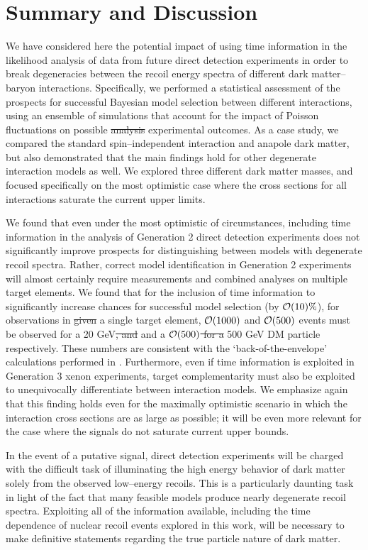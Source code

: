 \documentclass[11pt]{article}
\newcommand{\sjwColor}{red}
\newcommand{\sjw}[1]{{\color{\sjwColor} #1}}
\newcommand{\sjwrm}[1]{{\color{\sjwColor}\protect\sout{#1}}}
\begin{document}
\section{Summary and Discussion}\label{sec:conclusion}
We have considered here the potential impact of using time information in the likelihood analysis of data from future direct detection experiments in order to break degeneracies between the recoil energy spectra of different dark matter--baryon interactions. Specifically, we performed a statistical assessment of the prospects for successful Bayesian model selection between different interactions, using an ensemble of simulations that account for the impact of Poisson fluctuations on possible \sjwrm{analysis} \sjw{experimental} outcomes. As a case study, we compared the standard spin--independent interaction and anapole dark matter, but also demonstrated that the main findings hold for other degenerate interaction models as well. We explored three different dark matter masses, and focused specifically on the most optimistic case where the cross sections for all interactions saturate the current upper limits. 

We found that even under the most optimistic of circumstances, including time information in the analysis of Generation 2 direct detection experiments does not significantly improve prospects for distinguishing between models with degenerate recoil spectra. Rather, correct model identification in Generation 2 experiments will almost certainly require measurements and combined analyses on multiple target elements. We found that for the inclusion of time information to significantly increase chances for successful model selection (by ${\cal O}(10)\%$), \sjw{for observations in }\sjwrm{given} a single target element, ${\cal O}(1000)$ \sjw{and ${\cal O}(500)$} events must be observed for a 20 GeV\sjwrm{, and}\sjw{and a} \sjwrm{${\cal O}(500)$ for a} 500 GeV DM particle \sjw{respectively}. These numbers are consistent with the `back-of-the-envelope' calculations performed in \cite{DelNobile:2015nua}. Furthermore, even if time information is exploited in Generation 3 xenon experiments, target complementarity must also be exploited to unequivocally differentiate between interaction models. We emphasize again that this finding holds even for the maximally optimistic scenario in which the interaction cross sections are as large as possible; it will be even more relevant for the case where the signals do not saturate current upper bounds.

In the event of a putative signal, direct detection experiments will be charged with the difficult task of illuminating the high energy behavior of dark matter solely from the observed low--energy recoils. This is a particularly daunting task in light of the fact that many feasible models produce nearly degenerate recoil spectra. Exploiting all of the information available, including the time dependence of nuclear recoil events explored in this work, will be necessary to make definitive statements regarding the true particle nature of dark matter. 
\bigskip
\end{document}
